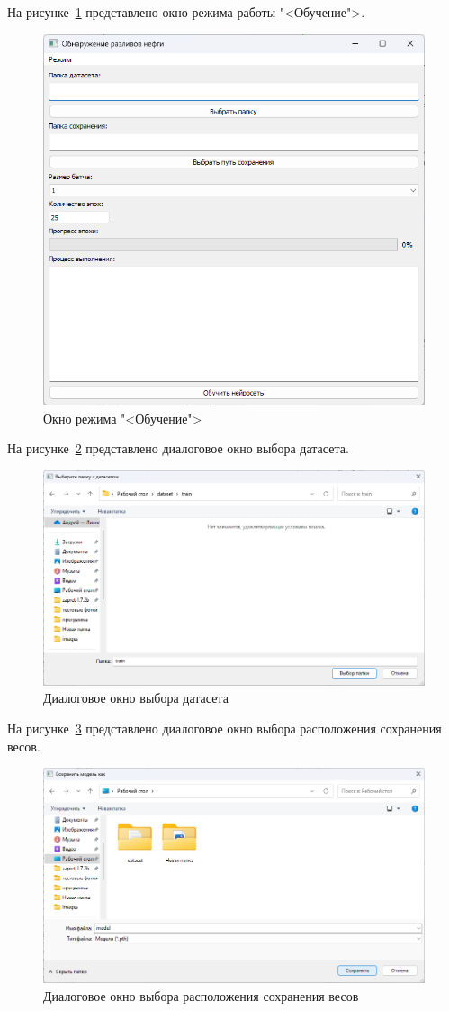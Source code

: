На рисунке~\ref{fig:train_ui} представлено окно режима работы "<Обучение">.
\begin{figure}[H]
	\centering
	\includegraphics[width=0.7\linewidth]{"images/обучение главное окно"}
	\caption{Окно режима "<Обучение">}
	\label{fig:train_ui}
\end{figure}

На рисунке~\ref{fig:dataset_select} представлено диалоговое окно выбора датасета.
\begin{figure}[H]
	\centering
	\includegraphics[width=0.7\linewidth]{"images/выбор датасета"}
	\caption{Диалоговое окно выбора датасета}
	\label{fig:dataset_select}
\end{figure}

На рисунке~\ref{fig:weights_save} представлено диалоговое окно выбора расположения сохранения весов.
\begin{figure}[H]
	\centering
	\includegraphics[width=0.7\linewidth]{"images/сохранение весов"}
	\caption{Диалоговое окно выбора расположения сохранения весов}
	\label{fig:weights_save}
\end{figure}


